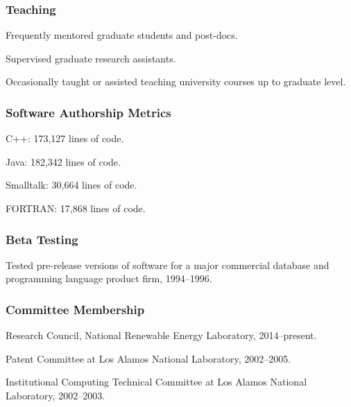 \documentclass[]{article}
\begin{document}
\subsubsection{Teaching}\label{teaching}

Frequently mentored graduate students and post-docs.

Supervised graduate research assistants.

Occasionally taught or assisted teaching university courses up to
graduate level.

\subsubsection{Software Authorship
Metrics}\label{software-authorship-metrics}

C++: 173,127 lines of code.

Java: 182,342 lines of code.

Smalltalk: 30,664 lines of code.

FORTRAN: 17,868 lines of code.

\subsubsection{Beta Testing}\label{beta-testing}

Tested pre-release versions of software for a major commercial database
and programming language product firm, 1994--1996.

\subsubsection{Committee Membership}\label{committee-membership}

Research Council, National Renewable Energy Laboratory, 2014--present.

Patent Committee at Los Alamos National Laboratory, 2002--2005.

Institutional Computing Technical Committee at Los Alamos National
Laboratory, 2002--2003.
\end{document}
